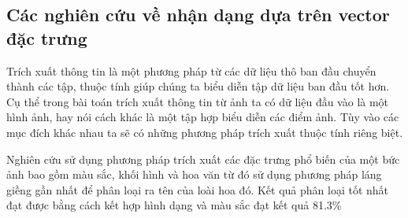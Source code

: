 \documentclass[12pt]{report}
\begin{document}
		\subsection{Các nghiên cứu về nhận dạng dựa trên vector đặc trưng}
																																																
		Trích xuất thông tin là một phương pháp từ các dữ liệu thô ban đầu chuyển thành các tập, thuộc tính giúp chúng ta biểu diễn tập dữ liệu ban đầu tốt hơn. Cụ thể trong bài toán trích xuất thông tin từ ảnh ta có dữ liệu đầu vào là một hình ảnh, hay nói cách khác là một tập hợp biểu diễn các điểm ảnh. Tùy vào các mục đích khác nhau ta sẽ có những phương pháp trích xuất thuộc tính riêng biệt.
																																																
		Nghiên cứu \cite{cia-Nilsback06} sử dụng phương pháp trích xuất các đặc trưng phổ biến của một bức ảnh bao gồm màu sắc, khối hình và hoa văn từ đó sử dụng phương pháp láng giềng gần nhất để phân loại ra tên của loài hoa đó. Kết quả phân loại tốt nhất đạt được bằng cách kết hợp hình dạng và màu sắc đạt kết quả 81.3\%
																																																
																																																
																																														
\end{document}
